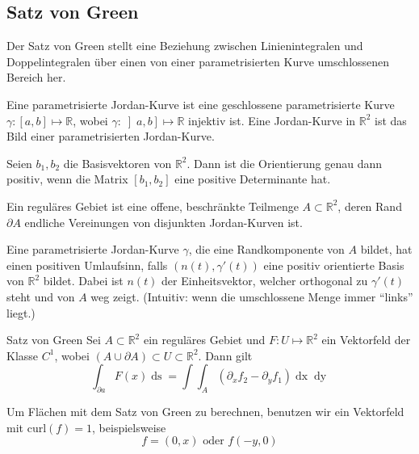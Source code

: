 \documentclass[a4paper,10pt]{article}
\def\R{\mathbb{R}}
\begin{document}
\subsection{Satz von Green}
Der Satz von Green stellt eine Beziehung zwischen Linienintegralen und Doppelintegralen über einen von einer parametrisierten Kurve umschlossenen Bereich her. 

Eine parametrisierte Jordan-Kurve ist eine geschlossene parametrisierte Kurve $\gamma : \left[a,b\right] \mapsto \R$, wobei $\gamma : \left] a,b \right] \mapsto \R$ injektiv ist. Eine Jordan-Kurve in $\R^2$ ist das Bild einer parametrisierten Jordan-Kurve.
    
    Seien $b_1, b_2$ die Basisvektoren von $\R^2$. Dann ist die Orientierung genau dann positiv, wenn die Matrix $\left[b_1, b_2\right]$ eine positive Determinante hat.
    
    Ein reguläres Gebiet ist eine offene, beschränkte Teilmenge $A\subset \R^2$, deren Rand $\partial A$ endliche Vereinungen von disjunkten Jordan-Kurven ist.
    
    Eine parametrisierte Jordan-Kurve $\gamma$, die eine Randkomponente von $A$ bildet, hat einen positiven Umlaufsinn, falls $(n(t), \gamma'(t))$ eine positiv orientierte Basis von $\R^2$ bildet. Dabei ist $n(t)$ der Einheitsvektor, welcher orthogonal zu $\gamma'(t)$ steht und von $A$ weg zeigt. (Intuitiv: wenn die umschlossene Menge immer ``links'' liegt.)
    
    \begin{mainbox}{Satz von Green}
        Sei $A \subset \R^2$ ein reguläres Gebiet und $F: U \mapsto \R^2$ ein Vektorfeld der Klasse $C^1$, wobei $(A \cup \partial A) \subset U \subset \R^2$. Dann gilt
        $$\int_{\partial a} F(x) \mathop{ds} = \int \int_A \left(\partial_x f_2 - \partial_y f_1\right) \mathop{dx} \mathop{dy}$$
    \end{mainbox}
    Um Flächen mit dem Satz von Green zu berechnen, benutzen wir ein Vektorfeld mit $\text{curl}(f) = 1$, beispielsweise $$f = (0,x) \text{ oder } f(-y, 0)$$
    
\end{document}
